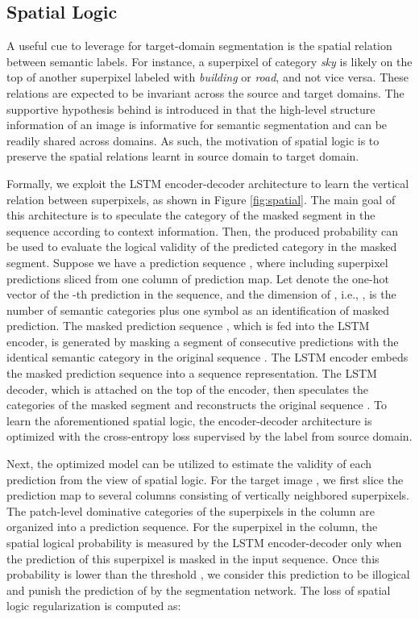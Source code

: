 \documentclass[10pt,twocolumn,letterpaper]{article}
\begin{document}
\subsection{Spatial Logic}
A useful cue to leverage for target-domain segmentation is the spatial relation between semantic labels. For instance, a superpixel of category \emph{sky} is likely on the top of another superpixel labeled with \emph{building} or \emph{road}, and not vice versa. These relations are expected to be invariant across the source and target domains. The supportive hypothesis behind is introduced in \cite{chang2019all} that the high-level structure information of an image is informative for semantic segmentation and can be readily shared across domains. As such, the motivation of spatial logic is to preserve the spatial relations learnt in source domain to target domain.

Formally, we exploit the LSTM encoder-decoder architecture to learn the vertical relation between superpixels, as shown in Figure \ref{fig:spatial}. The main goal of this architecture is to speculate the category of the masked segment in the sequence according to context information. Then, the produced probability can be used to evaluate the logical validity of the predicted category in the masked segment. Suppose we have a prediction sequence , where  including  superpixel predictions sliced from one column of prediction map. Let  denote the one-hot vector of the -th prediction in the sequence, and the dimension of , i.e., , is the number of semantic categories plus one symbol as an identification of masked prediction. The masked prediction sequence , which is fed into the LSTM encoder, is generated by masking a segment of consecutive predictions with the identical semantic category in the original sequence . The LSTM encoder embeds the masked prediction sequence  into a sequence representation. The LSTM decoder, which is attached on the top of the encoder, then speculates the categories of the masked segment and reconstructs the original sequence . To learn the aforementioned spatial logic, the encoder-decoder architecture is optimized with the cross-entropy loss supervised by the label from source domain.

Next, the optimized model can be utilized to estimate the validity of each prediction from the view of spatial logic. For the target image , we first slice the prediction map to several columns consisting of vertically neighbored superpixels. The patch-level dominative categories of the superpixels in the column are organized into a prediction sequence. For the superpixel  in the column, the spatial logical probability  is measured by the LSTM encoder-decoder only when the prediction of this superpixel is masked in the input sequence. Once this probability is lower than the threshold , we consider this prediction to be illogical and punish the prediction of  by the segmentation network. The loss of spatial logic regularization is computed as:
\end{document}
